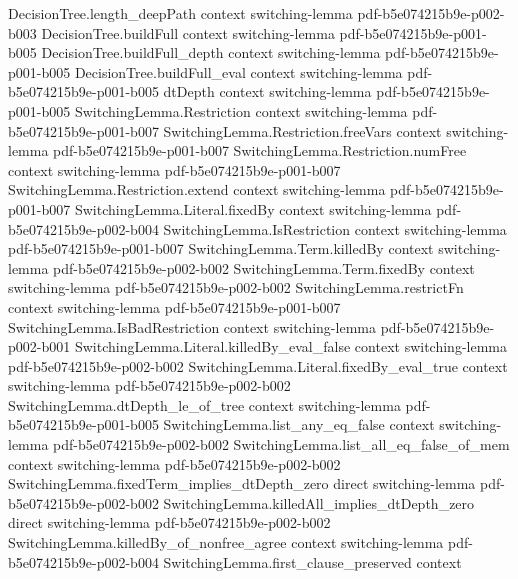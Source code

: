 \begin{lemma}
\proofstep
  {DecisionTree.length_deepPath}
  {context}
  {switching-lemma}
  {pdf-b5e074215b9e-p002-b003}
\proofstep
  {DecisionTree.buildFull}
  {context}
  {switching-lemma}
  {pdf-b5e074215b9e-p001-b005}
\proofstep
  {DecisionTree.buildFull_depth}
  {context}
  {switching-lemma}
  {pdf-b5e074215b9e-p001-b005}
\proofstep
  {DecisionTree.buildFull_eval}
  {context}
  {switching-lemma}
  {pdf-b5e074215b9e-p001-b005}
\proofstep
  {dtDepth}
  {context}
  {switching-lemma}
  {pdf-b5e074215b9e-p001-b005}
\proofstep
  {SwitchingLemma.Restriction}
  {context}
  {switching-lemma}
  {pdf-b5e074215b9e-p001-b007}
\proofstep
  {SwitchingLemma.Restriction.freeVars}
  {context}
  {switching-lemma}
  {pdf-b5e074215b9e-p001-b007}
\proofstep
  {SwitchingLemma.Restriction.numFree}
  {context}
  {switching-lemma}
  {pdf-b5e074215b9e-p001-b007}
\proofstep
  {SwitchingLemma.Restriction.extend}
  {context}
  {switching-lemma}
  {pdf-b5e074215b9e-p001-b007}
\proofstep
  {SwitchingLemma.Literal.fixedBy}
  {context}
  {switching-lemma}
  {pdf-b5e074215b9e-p002-b004}
\proofstep
  {SwitchingLemma.IsRestriction}
  {context}
  {switching-lemma}
  {pdf-b5e074215b9e-p001-b007}
\proofstep
  {SwitchingLemma.Term.killedBy}
  {context}
  {switching-lemma}
  {pdf-b5e074215b9e-p002-b002}
\proofstep
  {SwitchingLemma.Term.fixedBy}
  {context}
  {switching-lemma}
  {pdf-b5e074215b9e-p002-b002}
\proofstep
  {SwitchingLemma.restrictFn}
  {context}
  {switching-lemma}
  {pdf-b5e074215b9e-p001-b007}
\proofstep
  {SwitchingLemma.IsBadRestriction}
  {context}
  {switching-lemma}
  {pdf-b5e074215b9e-p002-b001}
\proofstep
  {SwitchingLemma.Literal.killedBy_eval_false}
  {context}
  {switching-lemma}
  {pdf-b5e074215b9e-p002-b002}
\proofstep
  {SwitchingLemma.Literal.fixedBy_eval_true}
  {context}
  {switching-lemma}
  {pdf-b5e074215b9e-p002-b002}
\proofstep
  {SwitchingLemma.dtDepth_le_of_tree}
  {context}
  {switching-lemma}
  {pdf-b5e074215b9e-p001-b005}
\proofstep
  {SwitchingLemma.list_any_eq_false}
  {context}
  {switching-lemma}
  {pdf-b5e074215b9e-p002-b002}
\proofstep
  {SwitchingLemma.list_all_eq_false_of_mem}
  {context}
  {switching-lemma}
  {pdf-b5e074215b9e-p002-b002}
\proofstep
  {SwitchingLemma.fixedTerm_implies_dtDepth_zero}
  {direct}
  {switching-lemma}
  {pdf-b5e074215b9e-p002-b002}
\proofstep
  {SwitchingLemma.killedAll_implies_dtDepth_zero}
  {direct}
  {switching-lemma}
  {pdf-b5e074215b9e-p002-b002}
\proofstep
  {SwitchingLemma.killedBy_of_nonfree_agree}
  {context}
  {switching-lemma}
  {pdf-b5e074215b9e-p002-b004}
\proofstep
  {SwitchingLemma.first_clause_preserved}
  {context}

\end{lemma}
